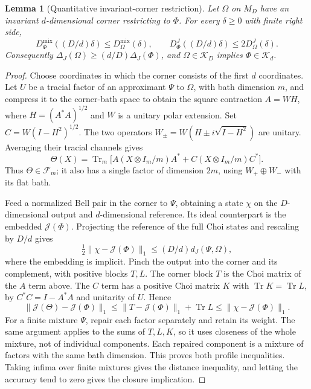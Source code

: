 \documentclass[11pt,a4paper]{article}
\theoremstyle{plain}
\newtheorem{lemma}[theorem]{Lemma}
\theoremstyle{definition}
\theoremstyle{remark}
\DeclareMathOperator{\Tr}{Tr}
\newcommand{\Dmix}{D^{\mathrm{mix}}}
\newcommand{\DChoi}{D^{J}}
\newcommand{\dJ}{d_J}
\begin{document}
\begin{lemma}[Quantitative invariant-corner restriction]\label{lem:corner-profile}
Let $\Omega$ on $M_D$ have an invariant $d$-dimensional corner restricting to $\Phi$. For every $\delta\ge0$ with finite right side,
\[
\Dmix_\Phi((D/d)\delta)\le\Dmix_\Omega(\delta),\qquad
\DChoi_\Phi((D/d)\delta)\le2\DChoi_\Omega(\delta).
\]
Consequently $\Delta_J(\Omega)\ge(d/D)\Delta_J(\Phi)$, and $\Omega\in\mathcal K_D$ implies $\Phi\in\mathcal K_d$.
\end{lemma}

\begin{proof}
Choose coordinates in which the corner consists of the first $d$ coordinates. Let $U$ be a tracial factor of an approximant $\Psi$ to
$\Omega$, with bath dimension $m$, and compress it to the corner-bath space to obtain the square contraction $A=WH$,
where $H=(A^*A)^{1/2}$ and $W$ is a unitary polar extension. Set $C=W(I-H^2)^{1/2}$. The two operators
$W_\pm=W(H\pm i\sqrt{I-H^2})$ are unitary. Averaging their tracial channels gives
\[
\Theta(X)=\Tr_m\big[A(X\otimes I_m/m)A^*+C(X\otimes I_m/m)C^*\big].
\]
Thus $\Theta\in\mathcal F_m$; it also has a single factor of dimension $2m$, using $W_+\oplus W_-$ with its flat bath.

Feed a normalized Bell pair in the corner to $\Psi$, obtaining a state $\chi$ on the $D$-dimensional output and $d$-dimensional reference.
Its ideal counterpart is the embedded $\mathcal J(\Phi)$. Projecting the reference of the full Choi states and rescaling by $D/d$ gives
\[
\tfrac12\|\chi-\mathcal J(\Phi)\|_1\le(D/d)\dJ(\Psi,\Omega),
\]
where the embedding is implicit. Pinch the output into the corner and its complement, with positive blocks $T,L$. The corner block
$T$ is the Choi matrix of the $A$ term above. The $C$ term has a positive Choi matrix $K$ with $\Tr K=\Tr L$, by
$C^*C=I-A^*A$ and unitarity of $U$. Hence
\[
\|\mathcal J(\Theta)-\mathcal J(\Phi)\|_1
\le\|T-\mathcal J(\Phi)\|_1+\Tr L
\le\|\chi-\mathcal J(\Phi)\|_1.
\]
For a finite mixture $\Psi$, repair each factor separately and retain its weight. The same argument applies to the sums of $T,L,K$,
so it uses closeness of the whole mixture, not of individual components. Each repaired component is a mixture of factors with the
same bath dimension. This proves both profile inequalities. Taking infima over finite mixtures gives the distance inequality, and
letting the accuracy tend to zero gives the closure implication.
\end{proof}
\end{document}
